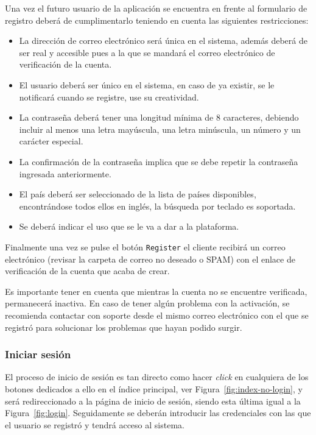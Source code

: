 Una vez el futuro usuario de la aplicación se encuentra en frente al formulario de registro deberá de cumplimentarlo teniendo en cuenta las siguientes restricciones:
\begin{itemize}
\item La dirección de correo electrónico será única en el sistema, además deberá de ser real y accesible pues a la que se mandará el correo electrónico de verificación de la cuenta.
\item El usuario deberá ser único en el sistema, en caso de ya existir, se le notificará cuando se registre, use su creatividad.
\item La contraseña deberá tener una longitud mínima de 8 caracteres, debiendo incluir al menos una letra mayúscula, una letra minúscula, un número y un carácter especial.
\item La confirmación de la contraseña implica que se debe repetir la contraseña ingresada anteriormente.
\item El país deberá ser seleccionado de la lista de países disponibles, encontrándose todos ellos en inglés, la búsqueda por teclado es soportada.
\item Se deberá indicar el uso que se le va a dar a la plataforma.
\end{itemize}

Finalmente una vez se pulse el botón \texttt{Register} el cliente recibirá un correo electrónico (revisar la carpeta de correo no deseado o SPAM) con el enlace de verificación de la cuenta que acaba de crear.

Es importante tener en cuenta que mientras la cuenta no se encuentre verificada, permanecerá inactiva. En caso de tener algún problema con la activación, se recomienda contactar con soporte desde el mismo correo electrónico con el que se registró para solucionar los problemas que hayan podido surgir.

\subsubsection{Iniciar sesión}
El proceso de inicio de sesión es tan directo como hacer \textit{click} en cualquiera de los botones dedicados a ello en el índice principal, ver Figura~\ref{fig:index-no-login}, y será redireccionado a la página de inicio de sesión, siendo esta última igual a la Figura~\ref{fig:login}. Seguidamente se deberán introducir las credenciales con las que el usuario se registró y tendrá acceso al sistema.

